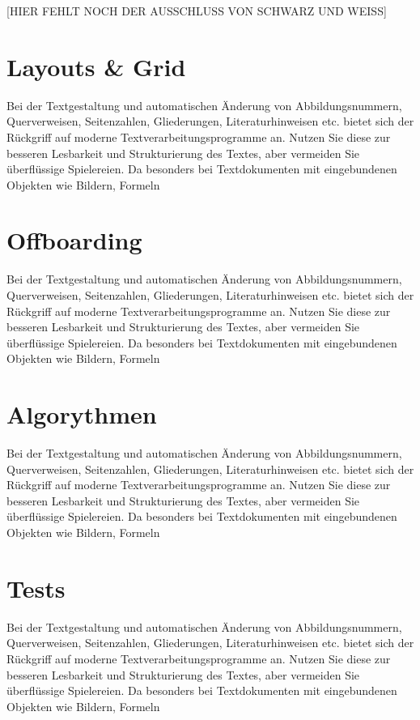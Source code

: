 [HIER FEHLT NOCH DER AUSSCHLUSS VON SCHWARZ UND WEISS]


\section{Layouts \& Grid}
Bei der Textgestaltung und automatischen Änderung von Abbildungsnummern, Querverweisen,
Seitenzahlen, Gliederungen, Literaturhinweisen etc. bietet sich der Rückgriff
auf moderne Textverarbeitungsprogramme an. Nutzen Sie diese zur besseren Lesbarkeit
und Strukturierung des Textes, aber vermeiden Sie überflüssige Spielereien. Da
besonders bei Textdokumenten mit eingebundenen Objekten wie Bildern, Formeln

\section{Offboarding}
Bei der Textgestaltung und automatischen Änderung von Abbildungsnummern, Querverweisen,
Seitenzahlen, Gliederungen, Literaturhinweisen etc. bietet sich der Rückgriff
auf moderne Textverarbeitungsprogramme an. Nutzen Sie diese zur besseren Lesbarkeit
und Strukturierung des Textes, aber vermeiden Sie überflüssige Spielereien. Da
besonders bei Textdokumenten mit eingebundenen Objekten wie Bildern, Formeln

\section{Algorythmen}
Bei der Textgestaltung und automatischen Änderung von Abbildungsnummern, Querverweisen,
Seitenzahlen, Gliederungen, Literaturhinweisen etc. bietet sich der Rückgriff
auf moderne Textverarbeitungsprogramme an. Nutzen Sie diese zur besseren Lesbarkeit
und Strukturierung des Textes, aber vermeiden Sie überflüssige Spielereien. Da
besonders bei Textdokumenten mit eingebundenen Objekten wie Bildern, Formeln

\section{Tests}
Bei der Textgestaltung und automatischen Änderung von Abbildungsnummern, Querverweisen,
Seitenzahlen, Gliederungen, Literaturhinweisen etc. bietet sich der Rückgriff
auf moderne Textverarbeitungsprogramme an. Nutzen Sie diese zur besseren Lesbarkeit
und Strukturierung des Textes, aber vermeiden Sie überflüssige Spielereien. Da
besonders bei Textdokumenten mit eingebundenen Objekten wie Bildern, Formeln

